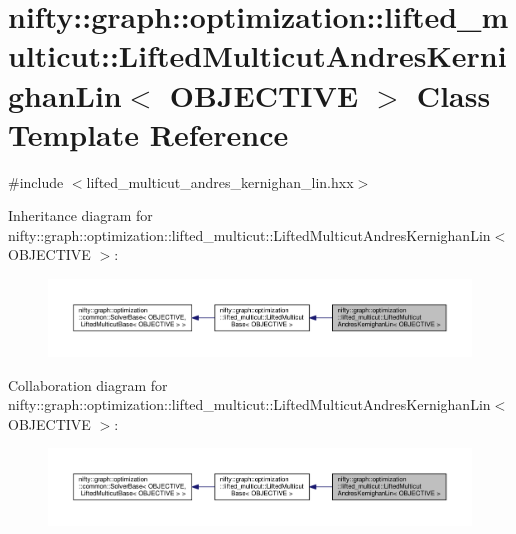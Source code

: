 \hypertarget{classnifty_1_1graph_1_1optimization_1_1lifted__multicut_1_1LiftedMulticutAndresKernighanLin}{}\section{nifty\+:\+:graph\+:\+:optimization\+:\+:lifted\+\_\+multicut\+:\+:Lifted\+Multicut\+Andres\+Kernighan\+Lin$<$ O\+B\+J\+E\+C\+T\+I\+V\+E $>$ Class Template Reference}
\label{classnifty_1_1graph_1_1optimization_1_1lifted__multicut_1_1LiftedMulticutAndresKernighanLin}


{\ttfamily \#include $<$lifted\+\_\+multicut\+\_\+andres\+\_\+kernighan\+\_\+lin.\+hxx$>$}



Inheritance diagram for nifty\+:\+:graph\+:\+:optimization\+:\+:lifted\+\_\+multicut\+:\+:Lifted\+Multicut\+Andres\+Kernighan\+Lin$<$ O\+B\+J\+E\+C\+T\+I\+V\+E $>$\+:\nopagebreak
\begin{figure}[H]
\begin{center}
\leavevmode
\includegraphics[width=350pt]{classnifty_1_1graph_1_1optimization_1_1lifted__multicut_1_1LiftedMulticutAndresKernighanLin__inherit__graph}
\end{center}
\end{figure}


Collaboration diagram for nifty\+:\+:graph\+:\+:optimization\+:\+:lifted\+\_\+multicut\+:\+:Lifted\+Multicut\+Andres\+Kernighan\+Lin$<$ O\+B\+J\+E\+C\+T\+I\+V\+E $>$\+:\nopagebreak
\begin{figure}[H]
\begin{center}
\leavevmode
\includegraphics[width=350pt]{classnifty_1_1graph_1_1optimization_1_1lifted__multicut_1_1LiftedMulticutAndresKernighanLin__coll__graph}
\end{center}
\end{figure}
